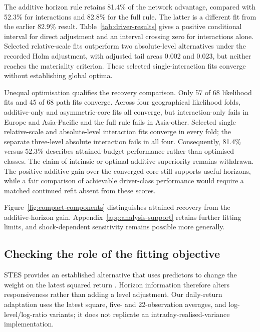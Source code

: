 The additive horizon rule retains 81.4\% of the network advantage, compared with 52.3\% for interactions and 82.8\% for the full rule. The latter is a different fit from the earlier 82.9\% result. Table~\ref{tab:driver-results} gives a positive conditional interval for direct adjustment and an interval crossing zero for interactions alone. Selected relative-scale fits outperform two absolute-level alternatives under the recorded Holm adjustment, with adjusted tail areas 0.002 and 0.023, but neither reaches the materiality criterion. These selected single-interaction fits converge without establishing global optima.

Unequal optimisation qualifies the recovery comparison. Only 57 of 68 likelihood fits and 45 of 68 path fits converge. Across four geographical likelihood folds, additive-only and asymmetric-core fits all converge, but interaction-only fails in Europe and Asia-Pacific and the full rule fails in Asia-other. Selected single relative-scale and absolute-level interaction fits converge in every fold; the separate three-level absolute interaction fails in all four. Consequently, 81.4\% versus 52.3\% describes attained-budget performance rather than optimised classes. The claim of intrinsic or optimal additive superiority remains withdrawn. The positive additive gain over the converged core still supports useful horizons, while a fair comparison of achievable driver-class performance would require a matched continued refit absent from these scores.



Figure~\ref{fig:compact-components} distinguishes attained recovery from the additive-horizon gain. Appendix~\ref{app:analysis-support} retains further fitting limits, and shock-dependent sensitivity remains possible more generally.


\subsection{Checking the role of the fitting objective}

STES provides an established alternative that uses predictors to change the weight on the latest squared return \citep{taylor2004smooth,ho2022stes}. Horizon information therefore alters responsiveness rather than adding a level adjustment. Our daily-return adaptation uses the latest square, five- and 22-observation averages, and log-level/log-ratio variants; it does not replicate an intraday-realised-variance implementation.

